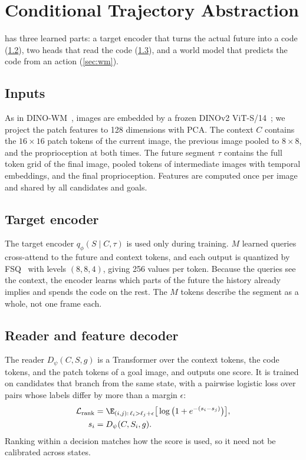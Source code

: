 \section{Conditional Trajectory Abstraction}
\label{sec:method}

\method has three learned parts: a target encoder that turns the actual future into a code (\cref{sec:source}), two heads that read the code (\cref{sec:reader}), and a world model that predicts the code from an action (\cref{sec:wm}).

\subsection{Inputs}
\label{sec:context}
As in DINO-WM~\cite{zhou2025dinowm}, images are embedded by a frozen DINOv2 ViT-S/14~\cite{oquab2024dinov2}; we project the patch features to 128 dimensions with PCA.
The context $C$ contains the $16{\times}16$ patch tokens of the current image, the previous image pooled to $8{\times}8$, and the proprioception at both times.
The future segment $\tau$ contains the full token grid of the final image, pooled tokens of intermediate images with temporal embeddings, and the final proprioception.
Features are computed once per image and shared by all candidates and goals.

\subsection{Target encoder}
\label{sec:source}
The target encoder $q_\phi(S\mid C,\tau)$ is used only during training.
$M$ learned queries cross-attend to the future and context tokens, and each output is quantized by FSQ~\cite{mentzer2024fsq} with levels $(8,8,4)$, giving 256 values per token.
Because the queries see the context, the encoder learns which parts of the future the history already implies and spends the code on the rest.
The $M$ tokens describe the segment as a whole, not one frame each.

\subsection{Reader and feature decoder}
\label{sec:reader}
The reader $D_\psi(C,S,g)$ is a Transformer over the context tokens, the code tokens, and the patch tokens of a goal image, and outputs one score.
It is trained on candidates that branch from the same state, with a pairwise logistic loss over pairs whose labels differ by more than a margin $\epsilon$:
\begin{equation}
\begin{aligned}
  \mathcal{L}_{\mathrm{rank}}&=\E_{(i,j):\,\ell_i>\ell_j+\epsilon}\big[\log\big(1+e^{-(s_i-s_j)}\big)\big],\\
  s_i&=D_\psi(C,S_i,g).
\end{aligned}
\label{eq:rank}
\end{equation}
Ranking within a decision matches how the score is used, so it need not be calibrated across states.

